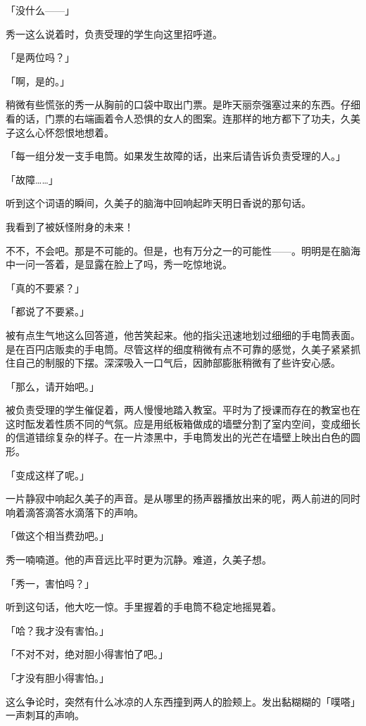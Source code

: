 \documentclass[UTF8]{ctexart}
\begin{document}
    「没什么——」

    秀一这么说着时，负责受理的学生向这里招呼道。

    「是两位吗？」

    「啊，是的。」

    稍微有些慌张的秀一从胸前的口袋中取出门票。是昨天丽奈强塞过来的东西。仔细看的话，门票的右端画着令人恐惧的女人的图案。连那样的地方都下了功夫，久美子这么心怀怨恨地想着。

    「每一组分发一支手电筒。如果发生故障的话，出来后请告诉负责受理的人。」

    「故障……」

    听到这个词语的瞬间，久美子的脑海中回响起昨天明日香说的那句话。

    我看到了被妖怪附身的未来！

    不不，不会吧。那是不可能的。但是，也有万分之一的可能性——。明明是在脑海中一问一答着，是显露在脸上了吗，秀一吃惊地说。

    「真的不要紧？」

    「都说了不要紧。」

    被有点生气地这么回答道，他苦笑起来。他的指尖迅速地划过细细的手电筒表面。是在百円店贩卖的手电筒。尽管这样的细度稍微有点不可靠的感觉，久美子紧紧抓住自己的制服的下摆。深深吸入一口气后，因肺部膨胀稍微有了些许安心感。

    「那么，请开始吧。」

    被负责受理的学生催促着，两人慢慢地踏入教室。平时为了授课而存在的教室也在这时酝发着性质不同的气氛。应是用纸板箱做成的墙壁分割了室内空间，变成细长的信道错综复杂的样子。在一片漆黑中，手电筒发出的光芒在墙壁上映出白色的圆形。

    「变成这样了呢。」

    一片静寂中响起久美子的声音。是从哪里的扬声器播放出来的呢，两人前进的同时响着滴答滴答水滴落下的声响。

    「做这个相当费劲吧。」

    秀一喃喃道。他的声音远比平时更为沉静。难道，久美子想。

    「秀一，害怕吗？」

    听到这句话，他大吃一惊。手里握着的手电筒不稳定地摇晃着。

    「哈？我才没有害怕。」

    「不对不对，绝对胆小得害怕了吧。」

    「才没有胆小得害怕。」

    这么争论时，突然有什么冰凉的人东西撞到两人的脸颊上。发出黏糊糊的「噗嗒」一声刺耳的声响。
\end{document}
